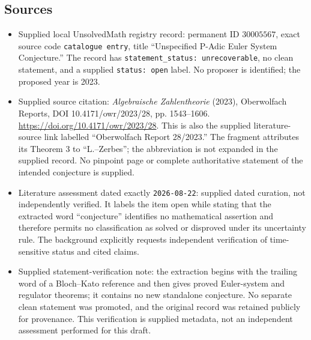 \documentclass[11pt]{article}
\begin{document}
\subsection{Sources}
\begin{itemize}
\item Supplied local UnsolvedMath registry record: permanent ID \(30005567\), exact source code \texttt{catalogue entry}, title ``Unspecified P-Adic Euler System Conjecture.'' The record has \texttt{statement\_status: unrecoverable}, no clean statement, and a supplied \texttt{status: open} label. No proposer is identified; the proposed year is 2023.
\item Supplied source citation: \emph{Algebraische Zahlentheorie} (2023), Oberwolfach Reports, DOI 10.4171/owr/2023/28, pp. 1543--1606. \url{https://doi.org/10.4171/owr/2023/28}. This is also the supplied literature-source link labelled ``Oberwolfach Report 28/2023.'' The fragment attributes its Theorem 3 to ``L.--Zerbes''; the abbreviation is not expanded in the supplied record. No pinpoint page or complete authoritative statement of the intended conjecture is supplied.
\item Literature assessment dated exactly \texttt{2026-08-22}: supplied dated curation, not independently verified. It labels the item open while stating that the extracted word ``conjecture'' identifies no mathematical assertion and therefore permits no classification as solved or disproved under its uncertainty rule. The background explicitly requests independent verification of time-sensitive status and cited claims.
\item Supplied statement-verification note: the extraction begins with the trailing word of a Bloch--Kato reference and then gives proved Euler-system and regulator theorems; it contains no new standalone conjecture. No separate clean statement was promoted, and the original record was retained publicly for provenance. This verification is supplied metadata, not an independent assessment performed for this draft.
\end{itemize}
\end{document}
